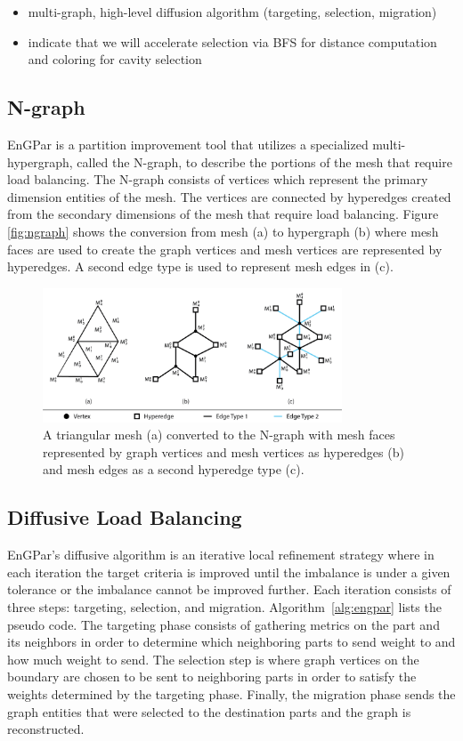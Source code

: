 \documentclass[graybox]{svmult}
\begin{document}
\begin{itemize}
  \item multi-graph, high-level diffusion algorithm (targeting, selection, migration)
  \item indicate that we will accelerate selection via BFS for distance computation and coloring for cavity selection
\end{itemize}

\subsection{N-graph}

EnGPar is a partition improvement tool that utilizes a specialized multi-hypergraph,
called the N-graph, to describe the portions of the mesh that require load balancing.
The N-graph consists of vertices which represent the primary dimension entities of the
mesh. The vertices are connected by hyperedges created from the secondary dimensions of
the mesh that require load balancing. Figure \ref{fig:ngraph} shows the conversion from
mesh (a) to hypergraph (b) where mesh faces are used to create the graph vertices and
mesh vertices are represented by hyperedges. A second edge type is used to represent mesh edges in (c). 

\begin{figure}[!ht]
  \centering
  \includegraphics[width=3.5in]{images/exampleMesh2Graph.png}
  \caption{A triangular mesh (a) converted to the N-graph with mesh faces represented by graph vertices and mesh vertices as hyperedges (b) and mesh edges as a second hyperedge type (c).}
  \label{fig:edgecounts}
\end{figure}


\subsection{Diffusive Load Balancing}

EnGPar's diffusive algorithm is an iterative local refinement strategy where in each
iteration the target criteria is improved until the imbalance is under a given
tolerance or the imbalance cannot be improved further. Each iteration consists of three
steps: targeting, selection, and migration.
Algorithm~\ref{alg:engpar} lists the pseudo code.
The targeting phase consists of gathering
metrics on the part and its neighbors in order to determine which neighboring parts to
send weight to and how much weight to send. The selection step is where graph vertices
on the boundary are chosen to be sent to neighboring parts in order to satisfy the
weights determined by the targeting phase. Finally, the migration phase sends the graph
entities that were selected to the destination parts and the graph is reconstructed.
\end{document}
